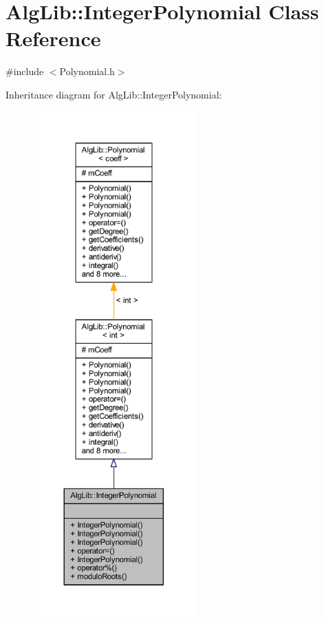 \hypertarget{class_alg_lib_1_1_integer_polynomial}{}\section{Alg\+Lib\+:\+:Integer\+Polynomial Class Reference}
\label{class_alg_lib_1_1_integer_polynomial}


{\ttfamily \#include $<$Polynomial.\+h$>$}



Inheritance diagram for Alg\+Lib\+:\+:Integer\+Polynomial\+:\nopagebreak
\begin{figure}[H]
\begin{center}
\leavevmode
\includegraphics[height=550pt]{class_alg_lib_1_1_integer_polynomial__inherit__graph}
\end{center}
\end{figure}


